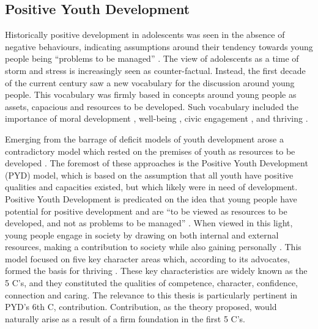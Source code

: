 
\subsection{Positive Youth Development} %

Historically positive development in adolescents was seen in the absence of negative behaviours, indicating assumptions around their tendency towards young people being “problems to be managed” \citep{Lerner2005a}. The view of adolescents as a time of storm and stress is increasingly seen as counter-factual. Instead, the first decade of the current century saw a new vocabulary for the discussion around young people. This vocabulary was firmly based in concepts around young people as assets, capacious and resources to be developed. Such vocabulary included the importance of moral development \citep{Youniss1999a,Colby1999,Damon1997}, well-being \citep{Dolan2010}, civic engagement \citep{Zaff2010,Flanagan2007a}, and thriving \citep{Lerner2007}. 


Emerging from the barrage of deficit models of youth development arose a contradictory model which rested on the premises of youth as resources to be developed  \citep{Lerner2010}. The foremost of these approaches is the Positive Youth Development (PYD) model, which is based on the assumption that all youth have positive qualities and capacities existed, but which likely were in need of development. Positive Youth Development is predicated on the idea that young people have potential for positive development \citep{Lerner2010} and are “to be viewed as resources to be developed, and not as problems to be managed” \citep[][p27]{Lerner2005a}. When viewed in this light, young people engage in society by drawing on both internal and external resources, making a contribution to society while also gaining personally \citep{Sherrod2007}. This model focused on five key character areas which, according to its advocates, formed the basis for thriving \citep{Lerner2010}. These key characteristics are widely known as the 5 C's, and they constituted the qualities of competence, character, confidence, connection and caring. The relevance to this thesis is particularly pertinent in PYD's 6th C, contribution. Contribution, as the theory proposed, would naturally arise as a result of a firm foundation in the first 5 C's. 

